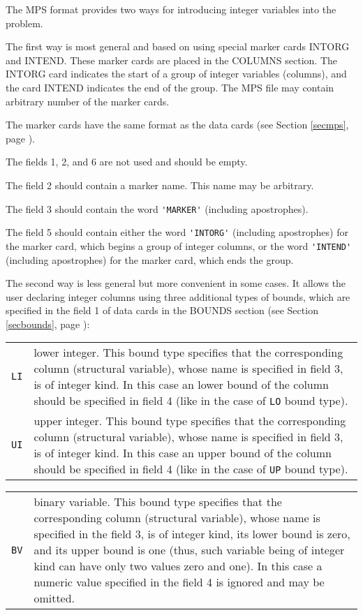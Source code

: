 The MPS format provides two ways for introducing integer variables into
the problem.

The first way is most general and based on using special marker cards
INTORG and INTEND. These marker cards are placed in the COLUMNS section.
The INTORG card indicates the start of a group of integer variables
(columns), and the card INTEND indicates the end of the group. The MPS
file may contain arbitrary number of the marker cards.

The marker cards have the same format as the data cards (see Section
\ref{secmps}, page \pageref{secmps}).

The fields 1, 2, and 6 are not used and should be empty.

The field 2 should contain a marker name. This name may be arbitrary.

The field 3 should contain the word \verb|'MARKER'| (including
apostrophes).

The field 5 should contain either the word \verb|'INTORG'| (including
apostrophes) for the marker card, which begins a group of integer
columns, or the word \verb|'INTEND'| (including apostrophes) for the
marker card, which ends the group.

The second way is less general but more convenient in some cases. It
allows the user declaring integer columns using three additional types
of bounds, which are specified in the field 1 of data cards in the
BOUNDS section (see Section \ref{secbounds}, page \pageref{secbounds}):

\begin{tabular}{@{}lp{112.3mm}@{}}
\verb|LI| & lower integer. This bound type specifies that the
corresponding column (structural variable), whose name is specified in
field 3, is of integer kind. In this case an lower bound of the
column should be specified in field 4 (like in the case of \verb|LO|
bound type). \\
\verb|UI| & upper integer. This bound type specifies that the
corresponding column (structural variable), whose name is specified in
field 3, is of integer kind. In this case an upper bound of the
column should be specified in field 4 (like in the case of \verb|UP|
bound type). \\
\end{tabular}

\pagebreak

\begin{tabular}{@{}lp{112.3mm}@{}}
\verb|BV| & binary variable. This bound type specifies that the
corresponding column (structural variable), whose name is specified in
the field 3, is of integer kind, its lower bound is zero, and its upper
bound is one (thus, such variable being of integer kind can have only
two values zero and one). In this case a numeric value specified in the
field 4 is ignored and may be omitted.\\
\end{tabular}

